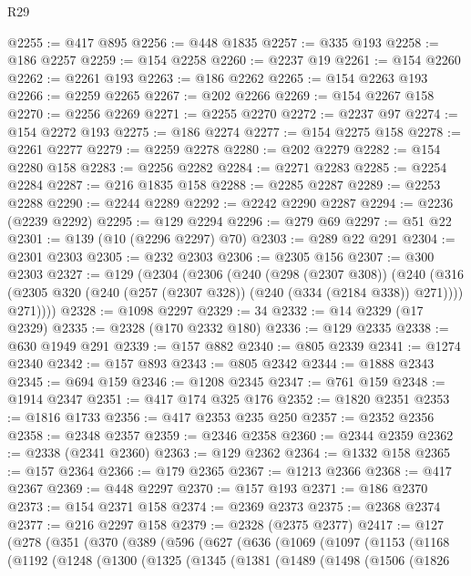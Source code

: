 \begin{lexlean}{R29}
\begin{coremodule}
@2255 := @417 @895
@2256 := @448 @1835
@2257 := @335 @193
@2258 := @186 @2257
@2259 := @154 @2258
@2260 := @2237 @19
@2261 := @154 @2260
@2262 := @2261 @193
@2263 := @186 @2262
@2265 := @154 @2263 @193
@2266 := @2259 @2265
@2267 := @202 @2266
@2269 := @154 @2267 @158
@2270 := @2256 @2269
@2271 := @2255 @2270
@2272 := @2237 @97
@2274 := @154 @2272 @193
@2275 := @186 @2274
@2277 := @154 @2275 @158
@2278 := @2261 @2277
@2279 := @2259 @2278
@2280 := @202 @2279
@2282 := @154 @2280 @158
@2283 := @2256 @2282
@2284 := @2271 @2283
@2285 := @2254 @2284
@2287 := @216 @1835 @158
@2288 := @2285 @2287
@2289 := @2253 @2288
@2290 := @2244 @2289
@2292 := @2242 @2290 @2287
@2294 := @2236 (@2239 @2292)
@2295 := @129 @2294
@2296 := @279 @69
@2297 := @51 @22
@2301 := @139 (@10 (@2296 @2297) @70)
@2303 := @289 @22 @291
@2304 := @2301 @2303
@2305 := @232 @2303
@2306 := @2305 @156
@2307 := @300 @2303
@2327 := @129
    (@2304
      (@2306
        (@240
          (@298 (@2307 @308))
          (@240
            (@316 (@2305 @320 (@240 (@257 (@2307 @328)) (@240 (@334 (@2184 @338)) @271))))
            @271))))
@2328 := @1098 @2297
@2329 := 34
@2332 := @14 @2329 (@17 @2329)
@2335 := @2328 (@170 @2332 @180)
@2336 := @129 @2335
@2338 := @630 @1949 @291
@2339 := @157 @882
@2340 := @805 @2339
@2341 := @1274 @2340
@2342 := @157 @893
@2343 := @805 @2342
@2344 := @1888 @2343
@2345 := @694 @159
@2346 := @1208 @2345
@2347 := @761 @159
@2348 := @1914 @2347
@2351 := @417 @174 @325 @176
@2352 := @1820 @2351
@2353 := @1816 @1733
@2356 := @417 @2353 @235 @250
@2357 := @2352 @2356
@2358 := @2348 @2357
@2359 := @2346 @2358
@2360 := @2344 @2359
@2362 := @2338 (@2341 @2360)
@2363 := @129 @2362
@2364 := @1332 @158
@2365 := @157 @2364
@2366 := @179 @2365
@2367 := @1213 @2366
@2368 := @417 @2367
@2369 := @448 @2297
@2370 := @157 @193
@2371 := @186 @2370
@2373 := @154 @2371 @158
@2374 := @2369 @2373
@2375 := @2368 @2374
@2377 := @216 @2297 @158
@2379 := @2328 (@2375 @2377)
@2417 := @127
    (@278
      (@351
        (@370
          (@389
            (@596
              (@627
                (@636
                  (@1069
                    (@1097
                      (@1153
                        (@1168
                          (@1192
                            (@1248
                              (@1300
                                (@1325
                                  (@1345
                                    (@1381
                                      (@1489
                                        (@1498
                                          (@1506
                                            (@1826

\end{coremodule}
\end{lexlean}
